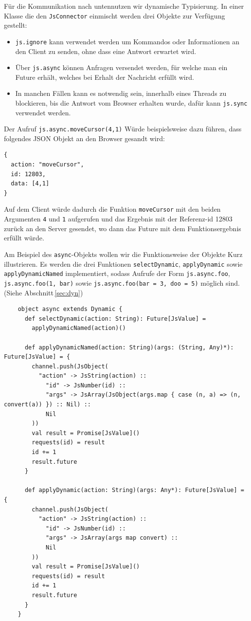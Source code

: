 Für die Kommunikation nach \glqq unten\grqq nutzen wir dynamische Typisierung. In einer Klasse die
den \texttt{JsConnector} einmischt werden drei Objekte zur Verfügung gestellt:

\begin{itemize}
  \item \texttt{js.ignore} kann verwendet werden um Kommandos oder Informationen an den Client zu 
  senden, ohne dass eine Antwort erwartet wird.
  \item Über \texttt{js.async} können Anfragen versendet werden, für welche man ein Future erhält, 
  welches bei Erhalt der Nachricht erfüllt wird.
  \item In manchen Fällen kann es notwendig sein, innerhalb eines Threads zu blockieren, bis die 
  Antwort vom Browser erhalten wurde, dafür kann \texttt{js.sync} verwendet werden.
\end{itemize}

Der Aufruf \texttt{js.async.moveCursor(4,1)} Würde beispielsweise dazu führen, dass folgendes JSON
Objekt an den Browser gesandt wird:

\begin{lstlisting}
{
  action: "moveCursor",
  id: 12803,
  data: [4,1]
}
\end{lstlisting}

Auf dem Client würde dadurch die Funktion \texttt{moveCursor} mit den beiden Argumenten \texttt{4}
und \texttt{1} aufgerufen und das Ergebnis mit der Referenz-id 12803 zurück an den Server gesendet,
wo dann das Future mit dem Funktionsergebnis erfüllt würde.

Am Beispiel des \texttt{async}-Objekts wollen wir die Funktionsweise der Objekte Kurz illustrieren.
Es werden die drei Funktionen \texttt{selectDynamic}, \texttt{applyDynamic} sowie
\texttt{applyDynamicNamed} implementiert, sodass Aufrufe der Form \texttt{js.async.foo},
\texttt{js.async.foo(1, bar)} sowie \texttt{js.async.foo(bar = 3, doo = 5)} möglich sind. (Siehe
Abschnitt\,\ref{sec:dyn})

\begin{lstlisting}
    object async extends Dynamic {
      def selectDynamic(action: String): Future[JsValue] =
        applyDynamicNamed(action)()

      def applyDynamicNamed(action: String)(args: (String, Any)*): Future[JsValue] = {
        channel.push(JsObject(
          "action" -> JsString(action) ::
            "id" -> JsNumber(id) ::
            "args" -> JsArray(JsObject(args.map { case (n, a) => (n, convert(a)) }) :: Nil) ::
            Nil
        ))
        val result = Promise[JsValue]()
        requests(id) = result
        id += 1
        result.future
      }

      def applyDynamic(action: String)(args: Any*): Future[JsValue] = {
        channel.push(JsObject(
          "action" -> JsString(action) ::
            "id" -> JsNumber(id) ::
            "args" -> JsArray(args map convert) ::
            Nil
        ))
        val result = Promise[JsValue]()
        requests(id) = result
        id += 1
        result.future
      }
    }
\end{lstlisting}

